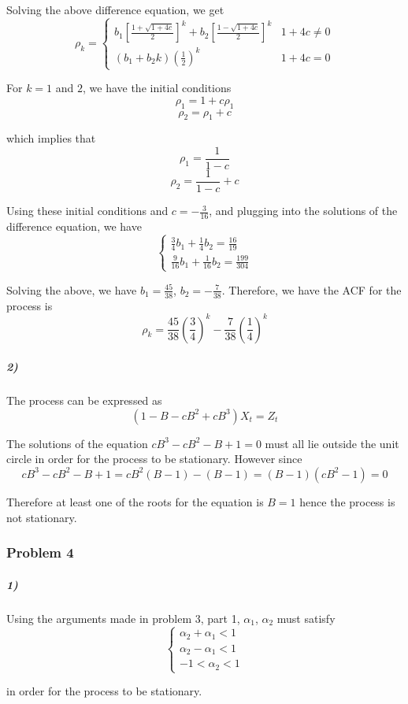 \documentclass{article}
\begin{document}
Solving the above difference equation, we get
\[
\rho_{k}=\begin{cases}
b_{1}[\frac{1+\sqrt{1+4c}}{2}]^{k}+b_{2}[\frac{1-\sqrt{1+4c}}{2}]^{k} & 1+4c\ne0\\
(b_{1}+b_{2}k)(\frac{1}{2})^{k} & 1+4c=0
\end{cases}
\]


For $k=1$ and $2$, we have the initial conditions
\[
\rho_{1}=1+c\rho_{1}
\]
\[
\rho_{2}=\rho_{1}+c
\]


which implies that
\[
\rho_{1}=\frac{1}{1-c}
\]
\[
\rho_{2}=\frac{1}{1-c}+c
\]


Using these initial conditions and $c=-\frac{3}{16}$, and plugging
into the solutions of the difference equation, we have
\[
\begin{cases}
\frac{3}{4}b_{1}+\frac{1}{4}b_{2}=\frac{16}{19}\\
\frac{9}{16}b_{1}+\frac{1}{16}b_{2}=\frac{199}{304}
\end{cases}
\]


Solving the above, we have $b_{1}=\frac{45}{38}$, $b_{2}=-\frac{7}{38}$.
Therefore, we have the ACF for the process is
\[
\rho_{k}=\frac{45}{38}(\frac{3}{4})^{k}-\frac{7}{38}(\frac{1}{4})^{k}
\]



\subparagraph*{2)}

The process can be expressed as
\[
(1-B-cB^{2}+cB^{3})X_{t}=Z_{t}
\]


The solutions of the
equation $cB^{3}-cB^{2}-B+1=0$ must all lie outside the unit circle
in order for the process to be stationary. However since
\[
cB^{3}-cB^{2}-B+1=cB^{2}(B-1)-(B-1)=(B-1)(cB^{2}-1)=0
\]


Therefore at least one of the roots for the equation is $B=1$ hence
the process is not stationary.


\subsubsection*{Problem 4}


\subparagraph*{1)}

Using the arguments made in problem 3, part 1, $\alpha_{1}$, $\alpha_{2}$
must satisfy
\[
\begin{cases}
\alpha_{2}+\alpha_{1}<1\\
\alpha_{2}-\alpha_{1}<1\\
-1<\alpha_{2}<1
\end{cases}
\]


in order for the process to be stationary.
\end{document}
